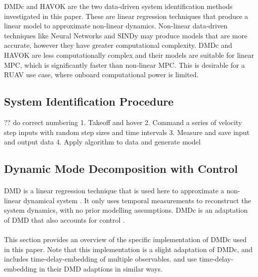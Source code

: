        DMDc and HAVOK are the two data-driven system identification methods investigated in this paper. 
        These are linear regression techniques that produce a linear model to approximate non-linear dynamics.
        Non-linear data-driven techniques like Neural Networks and SINDy \cite{Brunton2016} may produce models that are more accurate, however they have greater computational complexity.
        DMDc and HAVOK are less computationally complex and their models are suitable for linear MPC, which is significantly faster than non-linear MPC.
        This is desirable for a RUAV use case, where onboard computational power is limited.
    
    \subsection{System Identification Procedure}
        ?? do correct numbering
        1. Takeoff and hover 
        2. Command a series of velocity step inputs with random step sizes and time intervals
        3. Measure and save input and output data
        4. Apply algorithm to data and generate model
        
    \subsection{Dynamic Mode Decomposition with Control} \label{sec:dmdc}

        \paragraph{}
        DMD is a linear regression technique that is used here to approximate a non-linear dynamical system \cite{Tu2014}.
        It only uses temporal measurements to reconstruct the system dynamics, with no prior modelling assumptions.
        DMDc is an adaptation of DMD that also accounts for control \cite{Proctor2016}.

        \paragraph{}
        This section provides an overview of the specific implementation of DMDc used in this paper.
        Note that this implementation is a slight adaptation of DMDc, and includes time-delay-embedding of multiple observables. 
        \cite{Korda2018} and \cite{Arbabi2017} use time-delay-embedding in their DMD adaptions in similar ways.

